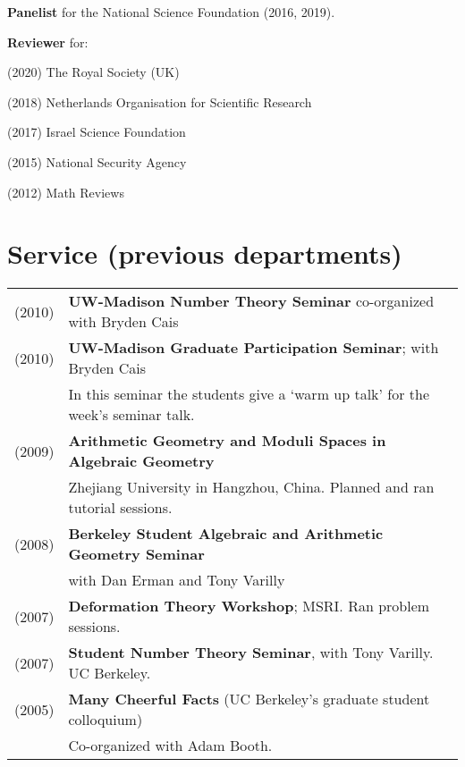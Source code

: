 \documentclass[margin,line]{res}
\newenvironment{list1}{
  \begin{list}{\ding{113}}{%
      \setlength{\itemsep}{0in}
      \setlength{\parsep}{0in} \setlength{\parskip}{0in}
      \setlength{\topsep}{0in} \setlength{\partopsep}{0in}
      \setlength{\leftmargin}{0.17in}}}{\end{list}}
\begin{document}
\begin{resume}
\textbf{Panelist} for the National Science Foundation (2016, 2019).

\vspace{-5pt}
\textbf{Reviewer} for: 
\begin{list1}
\item[] (2020) The Royal Society (UK)
\item[] (2018) Netherlands Organisation for Scientific Research
\item[] (2017) Israel Science Foundation 
\item[] (2015) National Security Agency 
\item[] (2012) Math Reviews
\end{list1}
\vspace{.05in} 


\section{\sc Service (previous departments)}  
  \begin{tabular}{ll}
    (2010) & \textbf{UW-Madison Number Theory Seminar} co-organized with Bryden Cais\\
    (2010) & \textbf{UW-Madison Graduate Participation Seminar}; with Bryden Cais\\
    & In this seminar the students give a `warm up talk' for the week's seminar talk.\\
    (2009) & \textbf{Arithmetic Geometry and Moduli Spaces in Algebraic Geometry}\\
    & Zhejiang University in Hangzhou, China. Planned and ran tutorial sessions.\\
    (2008) & \textbf{Berkeley Student Algebraic and Arithmetic Geometry Seminar} \\
    & with Dan Erman and Tony Varilly\\
    (2007) & \textbf{Deformation Theory Workshop}; MSRI. Ran problem sessions.\\
    (2007) & \textbf{Student Number Theory Seminar}, with Tony Varilly. UC Berkeley.\\
    (2005) & \textbf{Many Cheerful Facts}  (UC Berkeley's graduate student colloquium)\\
    & Co-organized with Adam Booth. \\
  \end{tabular}


\end{resume}
\end{document}
